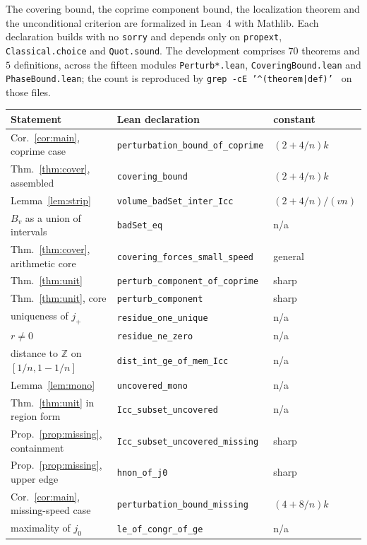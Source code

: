 \documentclass[11pt]{amsart}
\theoremstyle{plain}
\theoremstyle{definition}
\newcommand{\Z}{\mathbb{Z}}
\begin{document}
The covering bound, the coprime component bound, the localization theorem and the unconditional
criterion are formalized in Lean~4 with Mathlib. Each declaration builds with no \texttt{sorry} and
depends only on \texttt{propext}, \texttt{Classical.choice} and \texttt{Quot.sound}. The development
comprises $70$ theorems and $5$ definitions, across the fifteen modules
\texttt{Perturb*.lean}, \texttt{CoveringBound.lean} and \texttt{PhaseBound.lean}; the count is
reproduced by
\texttt{grep -cE '\textasciicircum(theorem|def)' } on those files.

\begin{center}
\begin{tabular}{lll}
\hline
Statement & Lean declaration & constant \\
\hline
Cor.~\ref{cor:main}, coprime case & \texttt{perturbation\_bound\_of\_coprime} & $(2{+}4/n)k$ \\
Thm.~\ref{thm:cover}, assembled & \texttt{covering\_bound} & $(2{+}4/n)k$ \\
Lemma~\ref{lem:strip} & \texttt{volume\_badSet\_inter\_Icc} & $(2{+}4/n)/(vn)$ \\
$B_v$ as a union of intervals & \texttt{badSet\_eq} & n/a \\
Thm.~\ref{thm:cover}, arithmetic core & \texttt{covering\_forces\_small\_speed} & general \\
Thm.~\ref{thm:unit} & \texttt{perturb\_component\_of\_coprime} & sharp \\
Thm.~\ref{thm:unit}, core & \texttt{perturb\_component} & sharp \\
uniqueness of $j_+$ & \texttt{residue\_one\_unique} & n/a \\
$r\ne0$ & \texttt{residue\_ne\_zero} & n/a \\
distance to $\Z$ on $[1/n,1-1/n]$ & \texttt{dist\_int\_ge\_of\_mem\_Icc} & n/a \\
Lemma~\ref{lem:mono} & \texttt{uncovered\_mono} & n/a \\
Thm.~\ref{thm:unit} in region form & \texttt{Icc\_subset\_uncovered} & n/a \\
Prop.~\ref{prop:missing}, containment & \texttt{Icc\_subset\_uncovered\_missing} & sharp \\
Prop.~\ref{prop:missing}, upper edge & \texttt{hnon\_of\_j0} & sharp \\
Cor.~\ref{cor:main}, missing-speed case & \texttt{perturbation\_bound\_missing} & $(4{+}8/n)k$ \\
maximality of $j_0$ & \texttt{le\_of\_congr\_of\_ge} & n/a \\

\end{tabular}
\end{center}
\end{document}
